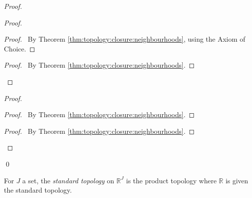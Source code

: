\begin{proof}
  \pf
  \begin{proof}
    \begin{proof}
      \pf\ By Theorem \ref{thm:topology:closure:neighbourhoods}, using the
      Axiom of Choice.
    \end{proof}
    \qedstep
    \begin{proof}
      \pf\ By Theorem \ref{thm:topology:closure:neighbourhoods}.
    \end{proof}
  \end{proof}
  \begin{proof}
    \begin{proof}
      \pf\ By Theorem \ref{thm:topology:closure:neighbourhoods}.
    \end{proof}
    \qedstep
    \begin{proof}
      \pf\ By Theorem \ref{thm:topology:closure:neighbourhoods}.
    \end{proof}
  \end{proof}
  \qed
\end{proof}

\begin{df}
  For $J$ a set, the \emph{standard topology} on $\mathbb{R}^J$ is the
  product topology where $\mathbb{R}$ is given the standard topology.
\end{df}

